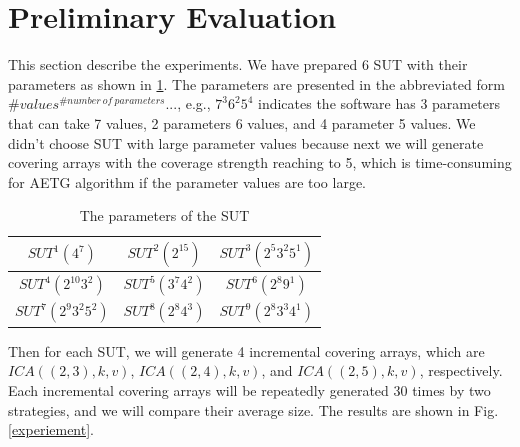 \documentclass[conference]{IEEEtran}
\theoremstyle{definition}
\begin{document}

\section{Preliminary Evaluation}
This section describe the experiments. We have prepared 6 SUT with their parameters as shown in \ref{ica_to_constuct}. The parameters are  presented in the abbreviated form $\#values^{\#number\ of\ parameters} ...$, e.g., $7^{3}6^{2}5^{4}$ indicates the software has 3 parameters that can take 7 values, 2 parameters 6 values, and 4 parameter 5 values. We didn't choose SUT with large parameter values because next we will generate covering arrays with the coverage strength reaching to 5, which is time-consuming for AETG algorithm if the parameter values are too large.

\begin{table}
\caption{The parameters of the SUT}
\label{ica_to_constuct}
\center
\setlength{\tabcolsep}{3pt}
\begin{tabular}{c | c | c }
\hline  $SUT^{1}(4^{7}) $& $SUT^{2}(2^{15})$ & $SUT^{3}(2^{5}3^{2}5^{1})$ \\
\hline  $SUT^{4}(2^{10}3^{2})$ & $SUT^{5}(3^{7}4^{2})$ & $SUT^{6}(2^{8}9^{1})$ \\
\hline $SUT^{7}(2^{9}3^{2}5^{2})$ & $SUT^{8}(2^{8}4^{3})$ & $SUT^{9}(2^{8}3^{3}4^{1})$ \\
\hline
\end{tabular}
  \end{table}

Then for each SUT, we will generate 4 incremental covering arrays, which are $ICA((2, 3), k ,v)$, $ICA((2, 4), k ,v)$, and $ICA((2, 5), k ,v)$, respectively. Each incremental covering arrays will be repeatedly generated 30 times by two strategies, and we will compare their average size. The results are shown in Fig.\ref{experiement}.



\end{document}

